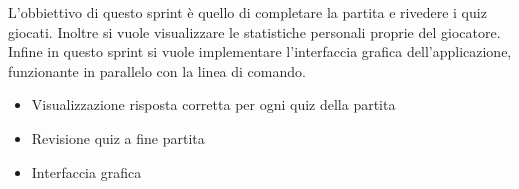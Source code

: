 L'obbiettivo di questo sprint è quello di completare la partita e rivedere i quiz giocati. Inoltre si vuole visualizzare le statistiche personali proprie del giocatore. 
Infine in questo sprint si vuole implementare l'interfaccia grafica dell'applicazione, funzionante in parallelo con la linea di comando.
\begin{itemize}
    \item Visualizzazione risposta corretta per ogni quiz della partita
    \item Revisione quiz a fine partita
    \item Interfaccia grafica
\end{itemize} 